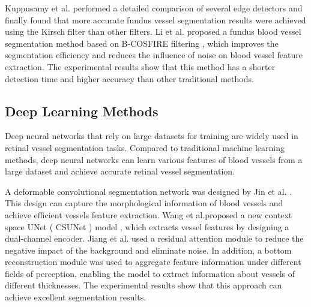 \documentclass[a4paper,fleqn]{cas-dc}
\begin{document}
 Kuppusamy et al. \cite{Kuppusamy2022RetinalBV} performed a detailed comparison of several edge detectors and finally found that more accurate fundus vessel segmentation results were achieved using the Kirsch filter than other filters. Li et al. proposed a fundus blood vessel segmentation method based on B-COSFIRE filtering \cite{Li2022RetinalVS}, which improves the segmentation efficiency and reduces the influence of noise on blood vessel feature extraction. The experimental results show that this method has a shorter detection time and higher accuracy than other traditional methods.
\subsection{Deep Learning Methods}

Deep neural networks that rely on large datasets for training are widely used in retinal vessel segmentation tasks. Compared to traditional machine learning methods, deep neural networks can learn various features of blood vessels from a large dataset and achieve accurate retinal vessel segmentation. 

A deformable convolutional segmentation network was designed by Jin et al. \cite{Jin2018DUNetAD}. This design can capture the morphological information of blood vessels and achieve efficient vessels feature extraction. Wang et al.proposed a new context space UNet ( CSUNet ) model \cite{Wang2020CSUNetAC}, which extracts vessel features by designing a dual-channel encoder.  Jiang et al. \cite{Jiang2020AMR} used a residual attention module to reduce the negative impact of the background and eliminate noise. In addition, a bottom reconstruction module was used to aggregate feature information under different fields of perception, enabling the model to extract information about vessels of different thicknesses. The experimental results show that this approach can achieve excellent segmentation results. 
\end{document}
